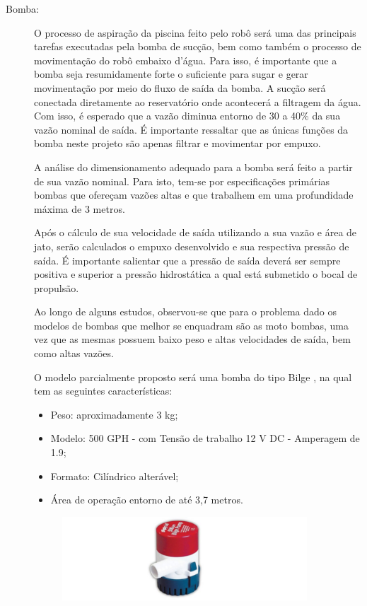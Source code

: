 \FloatBarrier
\par
\begin{description}
\item[Bomba:] O processo de aspiração da piscina feito pelo robô será uma das
principais tarefas executadas pela bomba de sucção, bem como também o processo
de movimentação do robô embaixo d’água. Para isso, é importante que a bomba
seja resumidamente forte o suficiente para sugar e gerar movimentação por meio
do fluxo de saída da bomba. A sucção será conectada diretamente ao reservatório
onde acontecerá a filtragem da água. Com isso, é esperado que a vazão diminua
entorno de 30 a 40\% da sua vazão nominal de saída. É importante ressaltar que
as únicas funções da bomba neste projeto são apenas filtrar e movimentar por empuxo.
\par
A análise do dimensionamento adequado para a bomba será feito a partir de sua vazão
nominal. Para isto, tem-se por especificações primárias bombas que ofereçam vazões
altas e que trabalhem em uma profundidade máxima de 3 metros. 
\par
Após o cálculo de sua velocidade de saída utilizando a sua vazão e área de jato,
serão calculados o empuxo desenvolvido e sua respectiva pressão de saída. É importante
salientar que a pressão de saída deverá ser sempre positiva e superior a pressão
hidrostática a qual está submetido o bocal de propulsão.
\par
Ao longo de alguns estudos, observou-se que para o problema dado os modelos de bombas
que melhor se enquadram são as moto bombas, uma vez que as mesmas possuem baixo peso e
altas velocidades de saída, bem como altas vazões.
\par
O modelo parcialmente proposto será uma bomba do tipo Bilge , na qual tem as seguintes
características:
  \begin{itemize}
  \item Peso: aproximadamente 3 kg;
  \item Modelo: 500 GPH - com Tensão de trabalho 12 V DC - Amperagem de 1.9;
  \item Formato: Cilíndrico alterável;
  \item Área de operação entorno de até 3,7 metros.
  \end{itemize}
\par
\begin{figure}[h]
  \centering
  \includegraphics[width=0.9\textwidth]{figures/waterbomb.png}

\end{figure}
\end{description}

